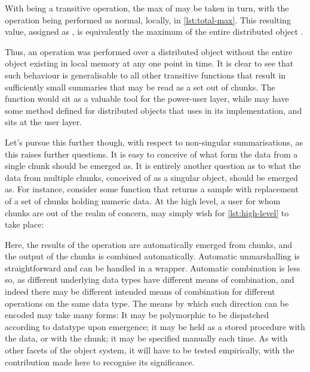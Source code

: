
With  being a transitive operation, the max of  may be taken in turn, with the operation being performed as normal, locally, in \cref{lst:total-max}.
This resulting value, assigned as , is equivalently the maximum of the entire distributed object .


Thus, an operation was performed over a distributed object without the entire object existing in local memory at any one point in time.
It is clear to see that such behaviour is generalisable to all other transitive functions that result in sufficiently small summaries that may be read as a set out of chunks.
The  function would sit as a valuable tool for the power-user layer, while  may have some method defined for distributed objects that uses  in its implementation, and sits at the user layer.

Let's pursue this further though, with respect to non-singular summarisations, as this raises further questions.
It is easy to conceive of what form the data from a single chunk should be emerged as.
It is entirely another question as to what the data from multiple chunks, conceived of as a singular object, should be emerged as.
For instance, consider some function that returns a sample with replacement of a set of chunks holding numeric data.
At the high level, a user for whom chunks are out of the realm of concern, may simply wish for \cref{lst:high-level} to take place:


Here, the results of the operation are automatically emerged from chunks, and the output of the chunks is combined automatically.
Automatic unmarshalling is straightforward and can be handled in a wrapper.
Automatic combination is less so, as different underlying data types have different means of combination, and indeed there may be different intended means of combination for different operations on the same data type.
The means by which such direction can be encoded may take many forms: It may be polymorphic to be dispatched according to datatype upon emergence; it may be held as a stored procedure with the data, or with the chunk; it may be specified manually each time.
As with other facets of the object system, it will have to be tested empirically, with the contribution made here to recognise its significance.

